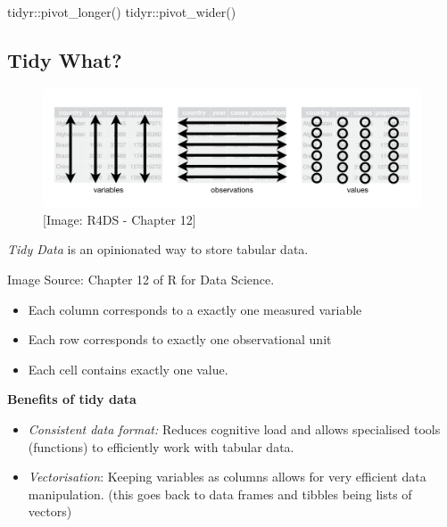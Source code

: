 \documentclass[
  12pt,
]{book}
\newenvironment{Shaded}{\begin{snugshade}}{\end{snugshade}}
\newcommand{\FunctionTok}[1]{\textcolor[rgb]{0.00,0.00,0.00}{#1}}
\newcommand{\NormalTok}[1]{#1}
\newcommand{\SpecialCharTok}[1]{\textcolor[rgb]{0.00,0.00,0.00}{#1}}
\providecommand{\tightlist}{%
  \setlength{\itemsep}{0pt}\setlength{\parskip}{0pt}}
\begin{document}
\begin{Shaded}
\begin{Highlighting}[]
\NormalTok{tidyr}\SpecialCharTok{::}\FunctionTok{pivot\_longer}\NormalTok{()}
\NormalTok{tidyr}\SpecialCharTok{::}\FunctionTok{pivot\_wider}\NormalTok{()}
\end{Highlighting}
\end{Shaded}

\hypertarget{tidy-what}{%
\subsection{Tidy What?}\label{tidy-what}}

\begin{figure}
\centering
\includegraphics{images/201-tabular-data/tidy-1.png}
\caption{{[}Image: R4DS - Chapter 12{]}}
\end{figure}

\emph{Tidy Data} is an opinionated way to store tabular data.

Image Source: Chapter 12 of R for Data Science.

\begin{itemize}
\tightlist
\item
  Each column corresponds to a exactly one measured variable
\item
  Each row corresponds to exactly one observational unit
\item
  Each cell contains exactly one value.
\end{itemize}

\textbf{Benefits of tidy data}

\begin{itemize}
\item
  \emph{Consistent data format:} Reduces cognitive load and allows specialised tools (functions) to efficiently work with tabular data.
\item
  \emph{Vectorisation}: Keeping variables as columns allows for very efficient data manipulation. (this goes back to data frames and tibbles being lists of vectors)
\end{itemize}
\end{document}
